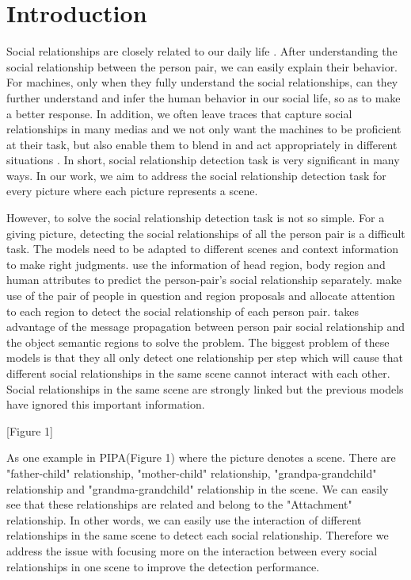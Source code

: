 \documentclass{article}
\begin{document}
\section{Introduction}
Social relationships are closely related to our daily life \cite{DBLP:conf/wacv/BarrCBF14}. After understanding the social relationship between the person pair, we can easily explain their behavior. For machines, only when they fully understand the social relationships, can they further understand and infer the human behavior in our social life, so as to make a better response. In addition, we often leave traces that capture social relationships in many medias and we not only want the machines to be proficient at their task, but also enable them to blend in and
act appropriately in different situations \cite{DBLP:conf/cvpr/SunSF17}. In short, social relationship detection task is very significant in many ways. In our work, we aim to address the social relationship detection task for every picture where each picture represents a scene. 

However, to solve the social relationship detection task is not so simple. For a giving picture, detecting the social relationships of all the person pair is a difficult task. The models need to be adapted to different scenes and context information to make right judgments.  \cite{DBLP:conf/cvpr/SunSF17} use the information of head region, body region and human attributes to predict the person-pair's social relationship separately. \cite{DBLP:conf/iccv/LiWZK17} make use of the pair of people in question and region proposals and allocate attention to each region to detect the social relationship of each person pair. \cite{DBLP:conf/ijcai/WangCRYCL18} takes advantage of the message propagation between person pair social relationship and the object  semantic regions to solve the problem. The biggest problem of these models is that they all only detect one relationship per step which will cause that different social relationships in the same scene cannot interact with each other. Social relationships in the same scene are strongly linked but the previous models have ignored this important information.

[Figure 1]

As one example in PIPA(Figure 1) where the picture denotes a scene. There are "father-child" relationship, "mother-child" relationship, "grandpa-grandchild" relationship and "grandma-grandchild" relationship in the scene. We can easily see that these relationships are related and belong to the "Attachment" relationship. In other words, we can easily use the interaction of different relationships in the same scene to detect each social relationship. Therefore we address the issue with focusing more on the interaction between every social relationships in one scene to improve the detection performance.
\end{document}
